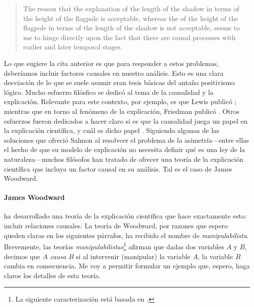 \begin{quote}
	The reason that the explanation of the length of the shadow in terms of the height of the flagpole is acceptable, whereas the  of the height of the flagpole in terms of the	length of the shadow is not acceptable, seems to me to hinge directly upon the fact that there are causal processes with earlier and later temporal stages. \parencite{Salmon1970}
\end{quote}

Lo que sugiere la cita anterior es que para responder a estos problemas, deberíamos incluir factores causales en nuestro análisis. Esto es una clara desviación de lo que se suele asumir eran tesis básicas del antaño positivismo lógico. Mucho esfuerzo filósfico se dedicó al tema de la causalidad y la explicación. Relevante para este contexto, por ejemplo, es que Lewis publicó ; mientras que en torno al fenómeno de la explicación, Friedman publicó . Otros esfuerzos fueron dedicados a hacer claro si es que la causalidad juega un papel en la explicación científica, y cuál es dicho papel \parencite{Kitcher1962-KITEUA}. Siguiendo algunas de las soluciones que ofreció Salmon al resolvcer el problema de la asimetría---entre ellas el hecho de que su modelo de explicación no necesita definir qué es una ley de la naturaleza---muchos filósofos han tratado de ofrecer una teoría de la explicación científica que incluya un factor causal en su análisis. Tal es el caso de James Woodward.

\paragraph{James Woodward \citeyear{Woodward2004}} ha
desarrollado una teoría de la explicación científica que hace exactamente esto: incluir relaciones causales. La teoría de Woodward, por razones que espero queden claras en los siguientes párrafos, ha recibido el nombre de \emph{manipulabilista}. Brevemente, las teorías \emph{manipulabilistas}\footnote{
	La	siguiente caracterización está basada en \parencite{sep-causation-mani, sep-causal-explanation-science,
	Woodward2004, Woodward2000-WOOEAI}.
}
afirman que dadas dos variables $ A $ y $ B $, decimos que $ A $
\emph{causa} $ B $ si al intervenir (manipular) la variable $ A $, la variable $ B $ cambia en consecuencia. Me voy a permitir formular un ejemplo que, espero, haga claros los detalles de esta teoría.

